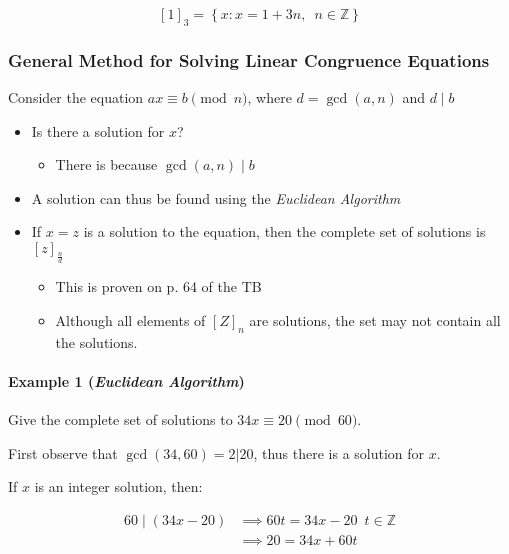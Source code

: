 \documentclass[
]{article}
\begin{document}
\[[1]_3 = \left \{ x : x = 1 + 3n, \enspace n \in \mathbb{Z} \right \}\]

\hypertarget{header-n554}{%
\subsubsection{General Method for Solving Linear Congruence
Equations}\label{header-n554}}

Consider the equation \(ax \equiv b \pmod{n}\), where \( d = \gcd(a,n)\)
and \( d \mid b\)

\begin{itemize}
\item
  Is there a solution for \(x\)?

  \begin{itemize}
  \item
    There is because \(\gcd(a,n) \mid b\)
  \end{itemize}
\item
  A solution can thus be found using the \emph{Euclidean Algorithm}
\item
  If \(x=z\) is a solution to the equation, then the complete set of
  solutions is \([z]_\frac{n}{d}\)

  \begin{itemize}
  \item
    This is proven on p. 64 of the TB
  \item
    Although all elements of \([Z]_n\) are solutions, the set may not
    contain all the solutions.
  \end{itemize}
\end{itemize}

\hypertarget{header-n571}{%
\paragraph{\texorpdfstring{Example 1 (\emph{Euclidean
Algorithm})}{Example 1 (Euclidean Algorithm)}}\label{header-n571}}

Give the complete set of solutions to \(34x \equiv 20 \pmod{60}\).

First observe that \(\gcd(34, 60) = 2 | 20\), thus there is a solution
for \(x\).

If \(x\) is an integer solution, then:

\begin{align}
60 \mid (34x-20) &\implies 60t = 34x-20 \enspace t \in \mathbb{Z} \\
&\implies 20 = 34x + 60t
\end{align}
\end{document}
